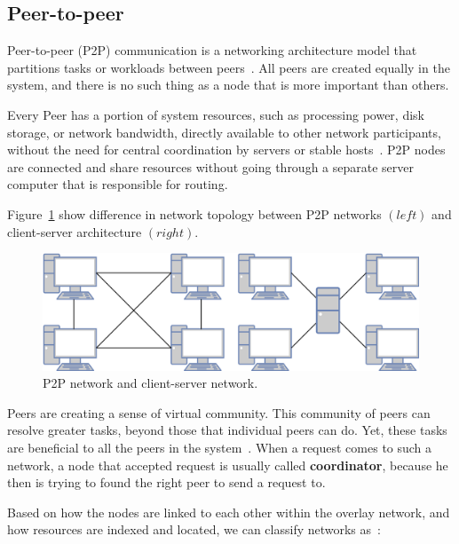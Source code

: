 \subsection{Peer-to-peer}\label{sec:p2p_networks}
%
Peer-to-peer (P2P) communication is a networking architecture model that partitions tasks or workloads between peers~\cite{Schollmeier01}. All peers are created equally in the system, and there is no such thing as a node that is more important than others. 

Every Peer has a portion of system resources, such as processing power, disk storage, or network bandwidth, directly available to other network participants, without the need for central coordination by servers or stable hosts~\cite{Schollmeier01}. P2P nodes are connected and share resources without going through a separate server computer that is responsible for routing. 

Figure~\ref{fig:fig2} show difference in network topology between P2P networks $(left)$ and client-server architecture $(right)$.

\begin{figure}[H]
	\begin{center}
		\includegraphics[scale=0.7]{images/Figure2.png}
	\end{center}
	\vspace{-0.6cm}
	\caption{P2P network and client-server network.}
	\label{fig:fig2}
\end{figure}

Peers are creating a sense of virtual community. This community of peers can resolve greater tasks, beyond those that individual peers can do. Yet, these tasks are beneficial to all the peers in the system~\cite{BandaraJ13}. When a request comes to such a network, a node that accepted request is usually called \textbf{coordinator}, because he then is trying to found the right peer to send a request to.

Based on how the nodes are linked to each other within the overlay network, and how resources are indexed and located, we can classify networks as~\cite{KamelSE07}:

